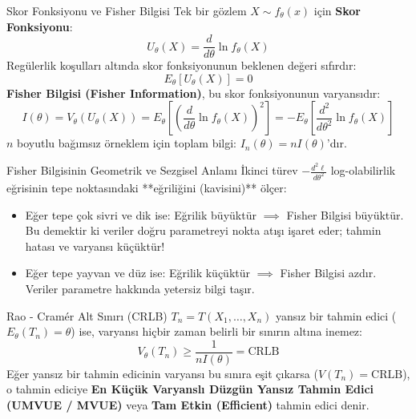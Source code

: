 \documentclass[12pt,a4paper]{article}
\begin{document}
\begin{tanim}{Skor Fonksiyonu ve Fisher Bilgisi}
Tek bir gözlem $X \sim f_\theta(x)$ için \textbf{Skor Fonksiyonu}:
\begin{equation}
    U_\theta(X) = \frac{d}{d\theta} \ln f_\theta(X)
\end{equation}
Regülerlik koşulları altında skor fonksiyonunun beklenen değeri sıfırdır:
\begin{equation}
    E_\theta[U_\theta(X)] = 0
\end{equation}
\textbf{Fisher Bilgisi (Fisher Information)}, bu skor fonksiyonunun varyansıdır:
\begin{equation}
    \boxed{I(\theta) = V_\theta(U_\theta(X)) = E_\theta\left[ \left( \frac{d}{d\theta} \ln f_\theta(X) \right)^2 \right] = - E_\theta\left[ \frac{d^2}{d\theta^2} \ln f_\theta(X) \right]}
\end{equation}
$n$ boyutlu bağımsız örneklem için toplam bilgi: $I_n(\theta) = n I(\theta)$'dır.
\end{tanim}

\begin{sezgi}{Fisher Bilgisinin Geometrik ve Sezgisel Anlamı}
İkinci türev $-\frac{d^2 \ell}{d\theta^2}$ log-olabilirlik eğrisinin tepe noktasındaki **eğriliğini (kavisini)** ölçer:
\begin{itemize}
    \item Eğer tepe çok sivri ve dik ise: Eğrilik büyüktür $\implies$ Fisher Bilgisi büyüktür. Bu demektir ki veriler doğru parametreyi nokta atışı işaret eder; tahmin hatası ve varyansı küçüktür!
    \item Eğer tepe yayvan ve düz ise: Eğrilik küçüktür $\implies$ Fisher Bilgisi azdır. Veriler parametre hakkında yetersiz bilgi taşır.
\end{itemize}
\end{sezgi}

\begin{tanim}{Rao - Cramér Alt Sınırı (CRLB)}
$T_n = T(X_1, \dots, X_n)$ yansız bir tahmin edici ($E_\theta(T_n) = \theta$) ise, varyansı hiçbir zaman belirli bir sınırın altına inemez:
\begin{equation}
    \boxed{V_\theta(T_n) \ge \frac{1}{n I(\theta)} = \text{CRLB}}
\end{equation}
Eğer yansız bir tahmin edicinin varyansı bu sınıra eşit çıkarsa ($V(T_n) = \text{CRLB}$), o tahmin ediciye \textbf{En Küçük Varyanslı Düzgün Yansız Tahmin Edici (UMVUE / MVUE)} veya \textbf{Tam Etkin (Efficient)} tahmin edici denir.
\end{tanim}
\end{document}
